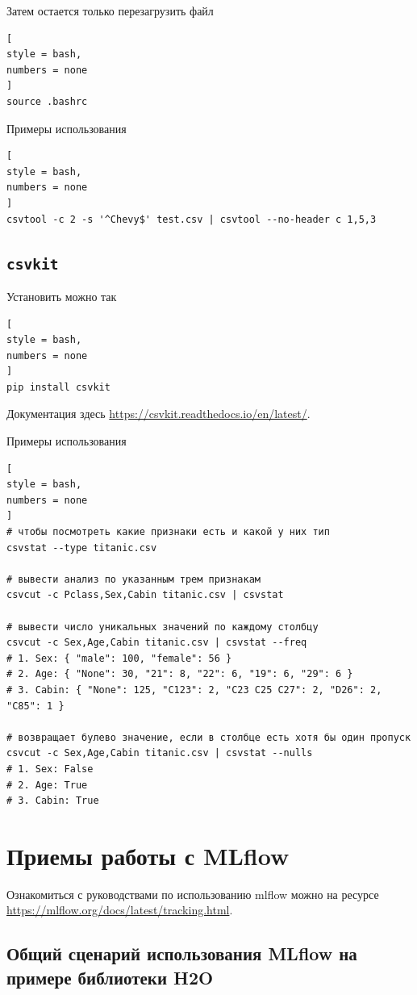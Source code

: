 \documentclass[%
	11pt,
	a4paper,
	utf8,
		]{article}
\begin{document}
Затем остается только перезагрузить файл
\begin{lstlisting}[
style = bash,
numbers = none
]
source .bashrc
\end{lstlisting}

Примеры использования
\begin{lstlisting}[
style = bash,
numbers = none	
]
csvtool -c 2 -s '^Chevy$' test.csv | csvtool --no-header c 1,5,3
\end{lstlisting}

\subsection{\texttt{csvkit}}

Установить можно так
\begin{lstlisting}[
style = bash,
numbers = none	
]
pip install csvkit
\end{lstlisting}

Документация здесь \url{https://csvkit.readthedocs.io/en/latest/}.

Примеры использования
\begin{lstlisting}[
style = bash,
numbers = none	
]
# чтобы посмотреть какие признаки есть и какой у них тип
csvstat --type titanic.csv

# вывести анализ по указанным трем признакам
csvcut -c Pclass,Sex,Cabin titanic.csv | csvstat

# вывести число уникальных значений по каждому столбцу
csvcut -c Sex,Age,Cabin titanic.csv | csvstat --freq
# 1. Sex: { "male": 100, "female": 56 }
# 2. Age: { "None": 30, "21": 8, "22": 6, "19": 6, "29": 6 }
# 3. Cabin: { "None": 125, "C123": 2, "C23 C25 C27": 2, "D26": 2, "C85": 1 }

# возвращает булево значение, если в столбце есть хотя бы один пропуск
csvcut -c Sex,Age,Cabin titanic.csv | csvstat --nulls
# 1. Sex: False
# 2. Age: True
# 3. Cabin: True
\end{lstlisting}


\section{Приемы работы с MLflow}

Ознакомиться с руководствами по использованию mlflow можно на ресурсе \url{https://mlflow.org/docs/latest/tracking.html}.

\subsection{Общий сценарий использования MLflow на примере библиотеки H2O}
\end{document}
